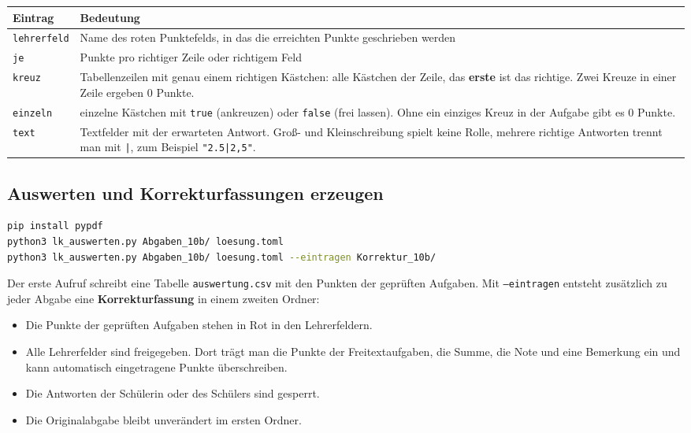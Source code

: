 \begin{Form}
\renewcommand{\arraystretch}{1.3}
\begin{tabular}{p{2.6cm} p{13cm}}
	\toprule
	\textbf{Eintrag} & \textbf{Bedeutung} \\
	\midrule
	\texttt{lehrerfeld} & Name des roten Punktefelds, in das die erreichten Punkte geschrieben werden \\
	\texttt{je} & Punkte pro richtiger Zeile oder richtigem Feld \\
	\texttt{kreuz} & Tabellenzeilen mit genau einem richtigen Kästchen: alle
	Kästchen der Zeile, das \textbf{erste} ist das richtige. Zwei Kreuze in
	einer Zeile ergeben 0 Punkte. \\
	\texttt{einzeln} & einzelne Kästchen mit \texttt{true} (ankreuzen) oder
	\texttt{false} (frei lassen). Ohne ein einziges Kreuz in der Aufgabe gibt
	es 0 Punkte. \\
	\texttt{text} & Textfelder mit der erwarteten Antwort. Groß- und
	Kleinschreibung spielt keine Rolle, mehrere richtige Antworten trennt man
	mit \texttt{|}, zum Beispiel \texttt{"2.5|2,5"}. \\
	\bottomrule
\end{tabular}

\subsection{Auswerten und Korrekturfassungen erzeugen}

\begin{lstlisting}[style=latex, language=bash]
pip install pypdf
python3 lk_auswerten.py Abgaben_10b/ loesung.toml
python3 lk_auswerten.py Abgaben_10b/ loesung.toml --eintragen Korrektur_10b/
\end{lstlisting}

Der erste Aufruf schreibt eine Tabelle \texttt{auswertung.csv} mit den
Punkten der geprüften Aufgaben. Mit \texttt{--eintragen} entsteht zusätzlich
zu jeder Abgabe eine \textbf{Korrekturfassung} in einem zweiten Ordner:

\begin{itemize}
	\item Die Punkte der geprüften Aufgaben stehen in Rot in den Lehrerfeldern.
	\item Alle Lehrerfelder sind freigegeben. Dort trägt man die Punkte der
	Freitextaufgaben, die Summe, die Note und eine Bemerkung ein und kann
	automatisch eingetragene Punkte überschreiben.
	\item Die Antworten der Schülerin oder des Schülers sind gesperrt.
	\item Die Originalabgabe bleibt unverändert im ersten Ordner.
\end{itemize}


\end{Form}
